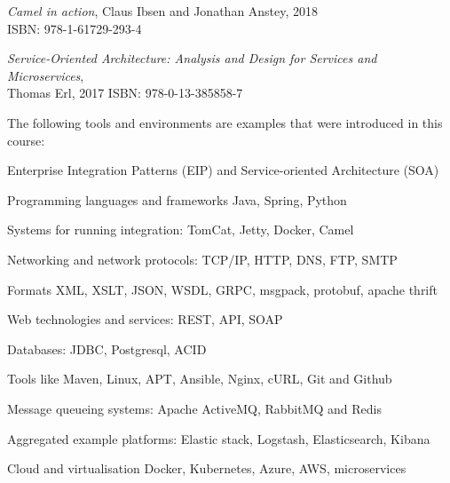\documentclass[Screen16to9,17pt]{foils}
\begin{document}


\emph{Camel in action}, Claus Ibsen and Jonathan Anstey, 2018\\
ISBN: 978-1-61729-293-4



\emph{Service‑Oriented Architecture: Analysis and Design for Services and Microservices},\\ Thomas Erl, 2017
ISBN: 978-0-13-385858-7



The following tools and environments are examples that were introduced in this course:

\begin{list2}
\item Enterprise Integration Patterns (EIP) and Service-oriented Architecture (SOA)
\item Programming languages and frameworks Java, Spring, Python
\item Systems for running integration: TomCat, Jetty, Docker, Camel
\item Networking and network protocols: TCP/IP, HTTP, DNS, FTP, SMTP
\item Formats XML, XSLT, JSON, WSDL, GRPC, msgpack, protobuf, apache thrift
\item Web technologies and services: REST, API, SOAP
\item Databases: JDBC, Postgresql, ACID
\item Tools like Maven, Linux, APT, Ansible, Nginx, cURL, Git and Github
\item Message queueing systems: Apache ActiveMQ, RabbitMQ and Redis
\item Aggregated example platforms: Elastic stack, Logstash, Elasticsearch, Kibana
\item Cloud and virtualisation Docker, Kubernetes, Azure, AWS, microservices
\end{list2}






\end{document}
